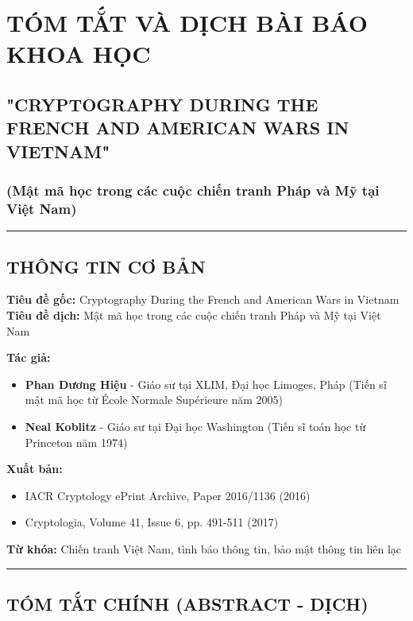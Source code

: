 \section{TÓM TẮT VÀ DỊCH BÀI BÁO KHOA HỌC}
\subsection{"CRYPTOGRAPHY DURING THE FRENCH AND AMERICAN WARS IN VIETNAM"}
\subsubsection{(Mật mã học trong các cuộc chiến tranh Pháp và Mỹ tại Việt Nam)}

\vspace{0.5cm}
\rule{\textwidth}{1pt}
\vspace{0.5cm}

\subsection{THÔNG TIN CƠ BẢN}

\textbf{Tiêu đề gốc:} Cryptography During the French and American Wars in Vietnam\\
\textbf{Tiêu đề dịch:} Mật mã học trong các cuộc chiến tranh Pháp và Mỹ tại Việt Nam

\textbf{Tác giả:}
\begin{itemize}
\item \textbf{Phan Dương Hiệu} - Giáo sư tại XLIM, Đại học Limoges, Pháp (Tiến sĩ mật mã học từ École Normale Supérieure năm 2005)
\item \textbf{Neal Koblitz} - Giáo sư tại Đại học Washington (Tiến sĩ toán học từ Princeton năm 1974)
\end{itemize}

\textbf{Xuất bản:}
\begin{itemize}
\item IACR Cryptology ePrint Archive, Paper 2016/1136 (2016)
\item Cryptologia, Volume 41, Issue 6, pp. 491-511 (2017)
\end{itemize}

\textbf{Từ khóa:} Chiến tranh Việt Nam, tình báo thông tin, bảo mật thông tin liên lạc

\vspace{0.5cm}
\rule{\textwidth}{1pt}
\vspace{0.5cm}

\subsection{TÓM TẮT CHÍNH (ABSTRACT - DỊCH)}

